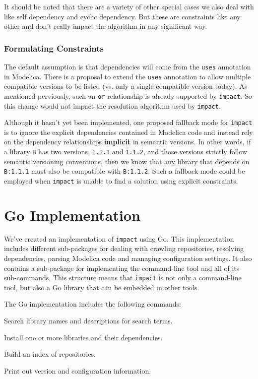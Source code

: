 \documentclass[11pt,a4paper,twocolumn]{article}
\newcommand{\code}[1]{\texttt{#1}} %
\begin{document}
It should be noted that there are a variety of other special cases we
also deal with like self dependency and cyclic dependency.  But these
are constraints like any other and don't really impact the algorithm
in any significant way.

\subsubsection{Formulating Constraints}

The default assumption is that dependencies will come from the
\code{uses} annotation in Modelica.  There is a proposal to extend the
\code{uses} annotation to allow multiple compatible versions to be
listed (vs. only a single compatible version today).  As mentioned
perviously, such an \code{or} relationship is already supported by
\code{impact}.  So this change would not impact the resolution
algorithm used by \code{impact}.

Although it hasn't yet been implemented, one proposed fallback mode
for \code{impact} is to ignore the explicit dependencies contained in
Modelica code and instead rely on the dependency relationships {\bf
  implicit} in semantic versions.  In other words, if a library
\code{B} has two versions, \code{1.1.1} and \code{1.1.2}, and those
versions strictly follow semantic versioning conventions, then we know
that any library that depends on \code{B:1.1.1} must also be
compatible with \code{B:1.1.2}.  Such a fallback mode could be
employed when \code{impact} is unable to find a solution using
explicit constraints.

\section{Go Implementation}


We've created an implementation of \code{impact} using Go\cite{Go}.
This implementation includes different sub-packages for dealing with
crawling repositories, resolving dependencies, parsing Modelica code
and managing configuration settings.  It also contains a sub-package
for implementing the command-line tool and all of its sub-commands.
This structure means that \code{impact} is not only a command-line
tool, but also a Go library that can be embedded in other tools.

The Go implementation includes the following commands:
\begin{description}[noitemsep]
  \item[\code{search}] Search library names and descriptions for
    search terms.
  \item[\code{install}] Install one or more libraries and their
    dependencies.
  \item[\code{index}] Build an index of repositories.
  \item[\code{version}] Print out version and configuration
    information.
\end{description}
\end{document}
